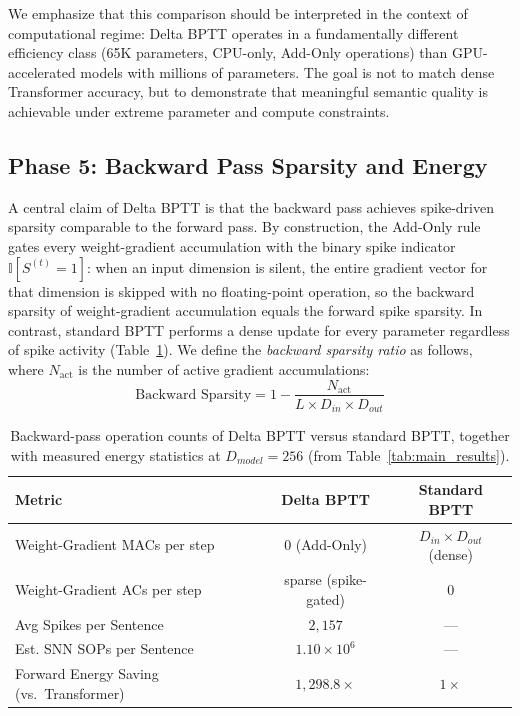 \documentclass[runningheads]{llncs}
\begin{document}
We emphasize that this comparison should be interpreted in the context of computational regime: Delta BPTT operates in a fundamentally different efficiency class (65K parameters, CPU-only, Add-Only operations) than GPU-accelerated models with millions of parameters. The goal is not to match dense Transformer accuracy, but to demonstrate that meaningful semantic quality is achievable under extreme parameter and compute constraints.

\subsection{Phase 5: Backward Pass Sparsity and Energy}
A central claim of Delta BPTT is that the backward pass achieves spike-driven sparsity comparable to the forward pass. By construction, the Add-Only rule gates every weight-gradient accumulation with the binary spike indicator $\mathbb{I}[S^{(t)} = 1]$: when an input dimension is silent, the entire gradient vector for that dimension is skipped with no floating-point operation, so the backward sparsity of weight-gradient accumulation equals the forward spike sparsity. In contrast, standard BPTT performs a dense update for every parameter regardless of spike activity (Table~\ref{tab:sparsity}). We define the \textit{backward sparsity ratio} as follows, where $N_{\mathrm{act}}$ is the number of active gradient accumulations:
\begin{equation}
\text{Backward Sparsity} = 1 - \frac{N_{\mathrm{act}}}{L \times D_{in} \times D_{out}}
\end{equation}

\begin{table}[t]
\caption{Backward-pass operation counts of Delta BPTT versus standard BPTT, together with measured energy statistics at $D_{model}=256$ (from Table~\ref{tab:main_results}).}\label{tab:sparsity}
\centering
\begin{tabular}{lcc}
\toprule
\textbf{Metric} & \textbf{Delta BPTT} & \textbf{Standard BPTT} \\
\midrule
Weight-Gradient MACs per step & $0$ (Add-Only) & $D_{in} \times D_{out}$ (dense) \\
Weight-Gradient ACs per step & sparse (spike-gated) & $0$ \\
Avg Spikes per Sentence & $2{,}157$ & --- \\
Est. SNN SOPs per Sentence & $1.10 \times 10^6$ & --- \\
Forward Energy Saving (vs.\ Transformer) & $1{,}298.8\times$ & $1\times$ \\
\bottomrule
\end{tabular}
\end{table}
\end{document}
